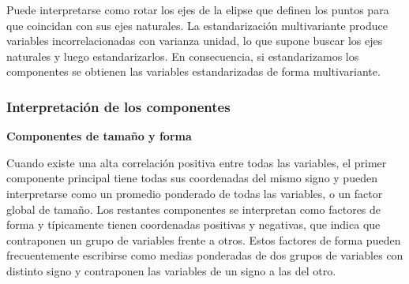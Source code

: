 \documentclass[12pt,letterpaper]{report} %
\begin{document}
Puede interpretarse como rotar los ejes de la elipse que definen los puntos para que coincidan con sus ejes naturales. La estandarización multivariante produce variables incorrelacionadas con varianza unidad, lo que supone buscar los ejes naturales y luego estandarizarlos. En consecuencia, si estandarizamos los componentes se obtienen las variables estandarizadas de forma multivariante.

\subsubsection{Interpretación de los componentes}

\textbf{Componentes de tamaño y forma}

Cuando existe una alta correlación positiva entre todas las variables, el primer componente principal tiene todas sus coordenadas del mismo signo y pueden interpretarse como un promedio ponderado de todas las variables, o un factor global de tamaño. Los restantes componentes se interpretan como factores de forma y típicamente tienen coordenadas positivas y negativas, que indica que contraponen un grupo de variables frente a otros. Estos factores de forma pueden frecuentemente escribirse como medias ponderadas de dos grupos de variables con distinto signo y contraponen las variables de un signo a las del otro. 
\end{document}
